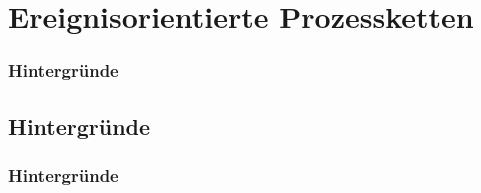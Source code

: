 \documentclass{beamer}
\begin{document}
 \section[Ereignisorientierte Prozessketten]{Ereignisorientierte Prozessketten}
 \begin{frame}
  \frametitle{Hintergründe}

 \end{frame}

 \subsection[Hintergründe]{Hintergründe}
 \begin{frame}
  \frametitle{Hintergründe}

 \end{frame}
\end{document}
